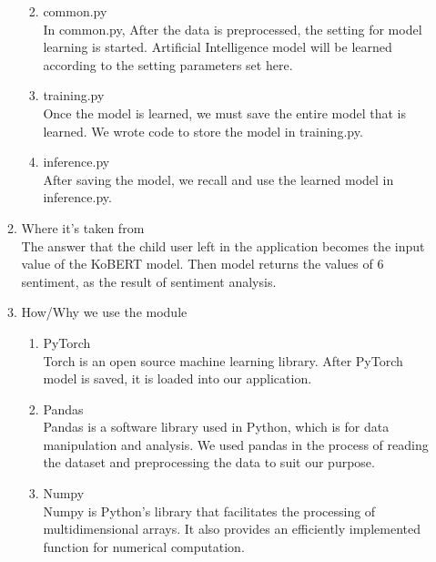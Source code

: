 \documentclass[conference]{IEEEtran}
\begin{document}
\begin{enumerate}
\begin{enumerate}
\begin{enumerate}
\begin{enumerate}
                \end{enumerate}
                \item common.py \\
                In common.py, After the data is preprocessed, the setting for model learning is started. Artificial Intelligence model will be learned according to the setting parameters set here.\newline
                \item training.py\\
                Once the model is learned, we must save the entire model that is learned. We wrote code to store the model in training.py.\newline
                \item inference.py\\
                After saving the model, we recall and use the learned model in inference.py.\newline
            \end{enumerate}
            
            \item Where it’s taken from
            \\The answer that the child user left in the application becomes the input value of the KoBERT model. Then model returns the values of 6 sentiment, as the result of sentiment analysis.\newline
            
            \item How/Why we use the module
            \begin{enumerate}
                \item PyTorch
                \\Torch is an open source machine learning library. After PyTorch model is saved, it is loaded into our application. \newline
                \item Pandas
                \\Pandas is a software library used in Python, which is for data manipulation and analysis. We used pandas in the process of reading the dataset and preprocessing the data to suit our purpose.\newline
                \item Numpy
                \\Numpy is Python's library that facilitates the processing of multidimensional arrays. It also provides an efficiently implemented function for numerical computation.\newline
            \end{enumerate}
        \end{enumerate}
        

\end{enumerate}
\end{document}
